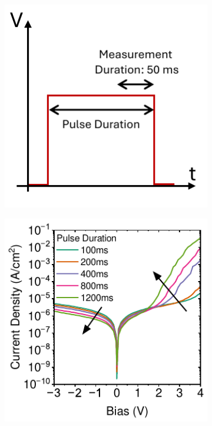 \begin{figure}[ht!]
    \begin{subfigure}[b]{0.3\textwidth}
        \centering        
        \includegraphics[width=\textwidth]{chapters/material_properties/images/PAIOS_Pulsed_Measurement.pdf}
        \caption{}
        \label{fig:ch2:pulsed_meas_PAIOS}
    \end{subfigure}
    \hspace{1cm} %
    \begin{subfigure}[b]{0.35\textwidth}
        \centering
        \includegraphics[width=\textwidth]{chapters/material_properties/images/Pulsed-PAIOS-plot.pdf}
        \caption{}
        \label{fig:ch2:pulsed_paios}
    \end{subfigure}


\end{figure}
